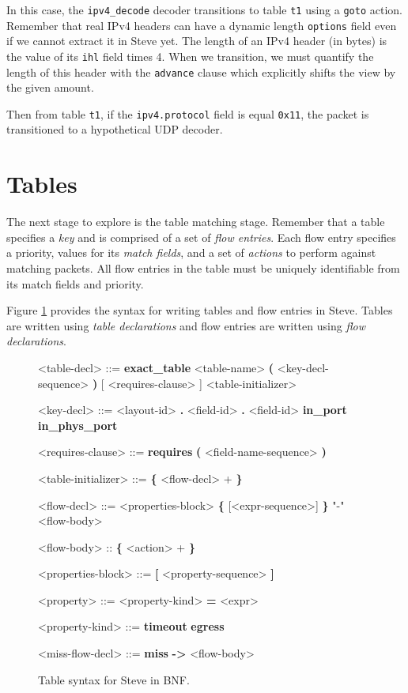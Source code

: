 In this case, the \texttt{ipv4\_decode} decoder transitions to table \texttt{t1} using a \texttt{goto} action. Remember that real IPv4 headers can have a dynamic length \texttt{options} field even if we cannot extract it in Steve yet. The length of an IPv4 header (in bytes) is the value of its \texttt{ihl} field times 4. When we transition, we must quantify the length of this header with the \texttt{advance} clause which explicitly shifts the view by the given amount.

Then from table \texttt{t1}, if the \texttt{ipv4.protocol} field is equal \texttt{0x11}, the packet is transitioned to a hypothetical UDP decoder.

\section{Tables} \label{tut:table}

The next stage to explore is the table matching stage. Remember that a table specifies a \textit{key} and is comprised of a set of \textit{flow entries}. Each flow entry specifies a priority, values for its \textit{match fields}, and a set of \textit{actions} to perform against matching packets. All flow entries in the table must be uniquely identifiable from its match fields and priority.

Figure \ref{fg:table_syntax} provides the syntax for writing tables and flow entries in Steve. Tables are written using \textit{table declarations} and flow entries are written using \textit{flow declarations}.

\begin{figure}[ht]
\begin{mdframed}
\begin{grammar}
<table-decl> ::=
\textbf{exact\_table} <table-name> \textbf{(} <key-decl-sequence> \textbf{)} 
[ <requires-clause> ] <table-initializer>

<key-decl> ::=
<layout-id> \textbf{.} <field-id>
 \textbf{.} <field-id>
\alt \textbf{in\_port}
\alt \textbf{in\_phys\_port}

<requires-clause> ::=
\textbf{requires} \textbf{(} <field-name-sequence> \textbf{)}

<table-initializer> ::= \textbf{\{} <flow-decl> + \textbf{\}}

<flow-decl> ::=
<properties-block>
\textbf{\{} [<expr-sequence>] \textbf{\}} "-\>" <flow-body>

<flow-body> :: \textbf{\{} <action> + \textbf{\}}

<properties-block> ::=
\textbf{[} <property-sequence> \textbf{]}

<property> ::=
<property-kind> \textbf{=} <expr>

<property-kind> ::=
\textbf{timeout}
\alt \textbf{egress}

<miss-flow-decl> ::=
\textbf{miss} \textbf{-\textgreater} <flow-body>
\end{grammar}
\end{mdframed}
\caption{Table syntax for Steve in BNF.}
\label{fg:table_syntax}
\end{figure}

